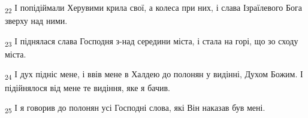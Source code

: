 \begin{tcolorbox}
\textsubscript{22} І попідіймали Херувими крила свої, а колеса при них, і слава Ізраїлевого Бога зверху над ними.
\end{tcolorbox}
\begin{tcolorbox}
\textsubscript{23} І піднялася слава Господня з-над середини міста, і стала на горі, що зо сходу міста.
\end{tcolorbox}
\begin{tcolorbox}
\textsubscript{24} І дух підніс мене, і ввів мене в Халдею до полонян у видінні, Духом Божим. І підійнялося від мене те видіння, яке я бачив.
\end{tcolorbox}
\begin{tcolorbox}
\textsubscript{25} І я говорив до полонян усі Господні слова, які Він наказав був мені.
\end{tcolorbox}
